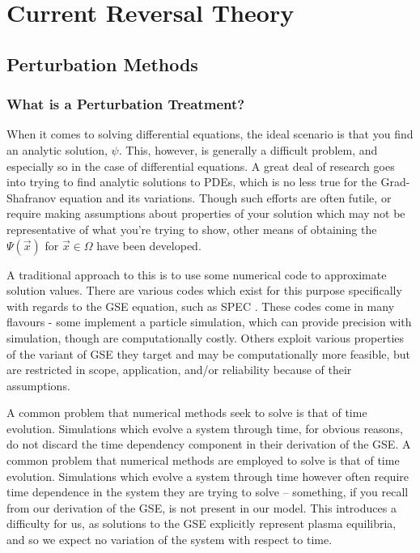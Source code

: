
\chapter{Current Reversal Theory}
\label{chapter3}



\section{Perturbation Methods}

\subsection{What is a Perturbation Treatment?}

When it comes to solving differential equations, the ideal scenario 
is that you find an analytic solution, $\psi$. This, however, is generally a 
difficult problem, and especially so in the case of differential equations. A great deal 
of research goes into trying to find analytic solutions to PDEs, 
which is no less true for the Grad-Shafranov equation and its variations. Though 
such efforts are often futile, or require making assumptions about properties of 
your solution which may not be representative of what you're trying to show, 
other means of obtaining the $\Psi(\vec{x})$ for $\vec{x} \in \Omega$ have been developed.

A traditional approach to this is to use some numerical code to approximate solution values. 
There are various codes which exist for this purpose specifically with regards to 
the GSE equation, such as SPEC \cite{spec-code}. These codes come in many flavours - 
some implement a particle simulation, which can provide precision with simulation, 
though are computationally costly. Others exploit various properties of the 
variant of GSE they target and may be computationally more feasible, but are 
restricted in scope, application, and/or reliability because of their assumptions.

A common problem that numerical methods seek to solve is that of time evolution. 
Simulations which evolve a system through time, for obvious reasons, do not discard 
the time dependency component in their derivation of the GSE. 
A common problem that numerical methods are employed to solve is that of time evolution. 
Simulations which evolve a system through time however often require time dependence in the 
system they are trying to solve -- something, if you recall from our derivation of the GSE, is 
not present in our model. This introduces a difficulty for us, as solutions to the GSE explicitly 
represent plasma equilibria, and so we expect no variation of the system with respect to time.

